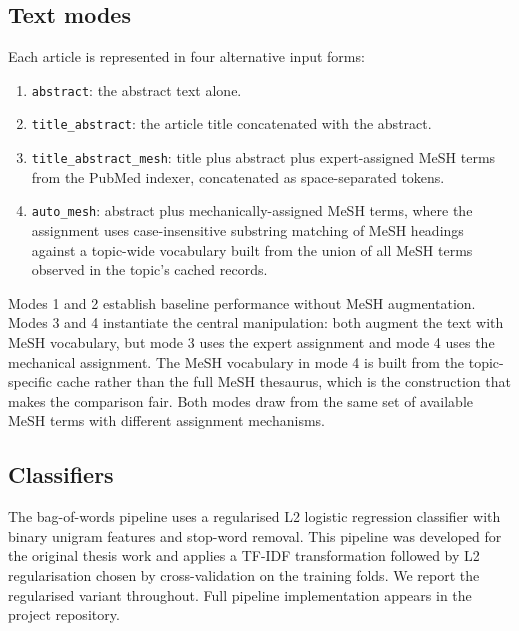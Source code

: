 \documentclass[11pt,a4paper]{article}
\begin{document}
\subsection{Text modes}

Each article is represented in four alternative input forms:

\begin{enumerate}
\item \texttt{abstract}: the abstract text alone.
\item \texttt{title\_abstract}: the article title concatenated with the abstract.
\item \texttt{title\_abstract\_mesh}: title plus abstract plus expert-assigned MeSH terms from the PubMed indexer, concatenated as space-separated tokens.
\item \texttt{auto\_mesh}: abstract plus mechanically-assigned MeSH terms, where the assignment uses case-insensitive substring matching of MeSH headings against a topic-wide vocabulary built from the union of all MeSH terms observed in the topic's cached records.
\end{enumerate}

Modes 1 and 2 establish baseline performance without MeSH augmentation. Modes 3 and 4 instantiate the central manipulation: both augment the text with MeSH vocabulary, but mode 3 uses the expert assignment and mode 4 uses the mechanical assignment. The MeSH vocabulary in mode 4 is built from the topic-specific cache rather than the full MeSH thesaurus, which is the construction that makes the comparison fair. Both modes draw from the same set of available MeSH terms with different assignment mechanisms.

\subsection{Classifiers}

The bag-of-words pipeline uses a regularised L2 logistic regression classifier with binary unigram features and stop-word removal. This pipeline was developed for the original thesis work and applies a TF-IDF transformation followed by L2 regularisation chosen by cross-validation on the training folds. We report the regularised variant throughout. Full pipeline implementation appears in the project repository.
\end{document}

